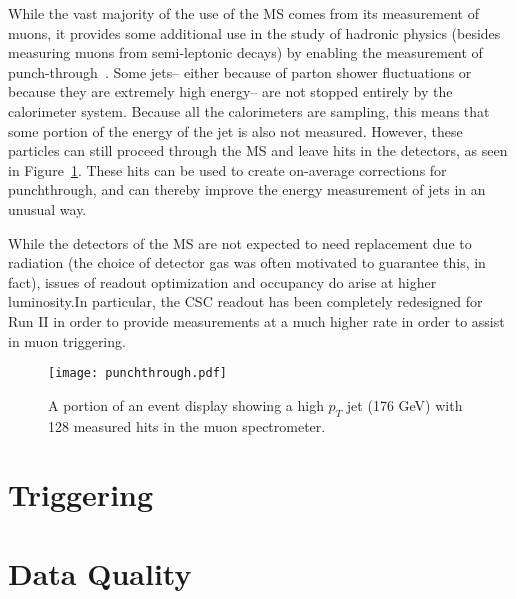 While the vast majority of the use of the MS comes from its measurement of muons, it provides some additional use in the study of hadronic physics (besides measuring muons from semi-leptonic decays) by enabling the measurement of punch-through~\cite{JES2010}. Some jets-- either because of parton shower fluctuations or because they are extremely high energy-- are not stopped entirely by the calorimeter system. Because all the calorimeters are sampling, this means that some portion of the energy of the jet is also not measured. However, these particles can still proceed through the MS and leave hits in the detectors, as seen in Figure~\ref{fig:detector:punchthrough}. These hits can be used to create on-average corrections for punchthrough, and can thereby improve the energy measurement of jets in an unusual way.

While the detectors of the MS are not expected to need replacement due to radiation (the choice of detector gas was often motivated to guarantee this, in fact), issues of readout optimization and occupancy do arise at higher luminosity.In particular, the CSC readout has been completely redesigned for Run II in order to provide measurements at a much higher rate in order to assist in muon triggering. 



\begin{figure}
\centering
\texttt{[image: punchthrough.pdf]}
\label{fig:detector:punchthrough}
\caption{A portion of an event display showing a high $p_T$ jet (176 GeV) with 128 measured hits in the muon spectrometer.}
\end{figure}



\section{Triggering}

\section{Data Quality}